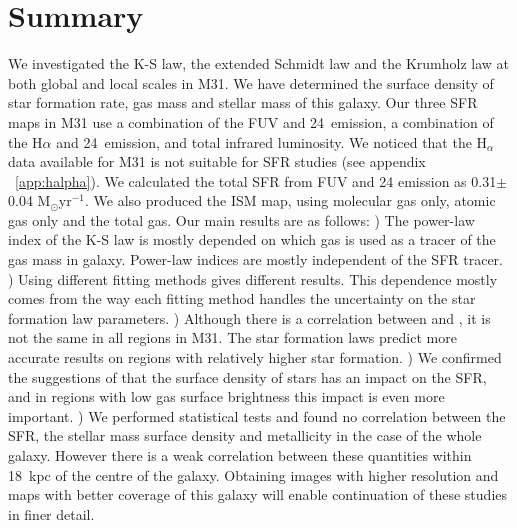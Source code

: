 \section{Summary}
 We investigated the K-S law, the extended Schmidt law and the Krumholz law at both global and local scales in M31. We have determined the surface density of star formation rate, gas mass and stellar mass of this galaxy. Our three SFR maps in M31 use a combination of the FUV and 24~\um emission, a combination of the H$\alpha$ and 24~\um emission, and total infrared luminosity. We noticed that the H$_\alpha$ data available for M31 is not suitable for SFR studies (see appendix ~\ref{app:halpha}). We calculated the total SFR from FUV and 24 \um emission as 0.31$\pm$ 0.04 M$_{\odot}$yr$^{-1}$. We also produced the ISM map, using molecular gas only, atomic gas only and the total gas. Our main results are as follows:
) The power-law index of the K-S law is mostly depended on which gas is used as a tracer of the gas mass in galaxy. Power-law indices are mostly independent of the SFR tracer.
) Using different fitting methods gives different results. This dependence mostly comes from the way each fitting method handles the uncertainty on the star formation law parameters.
) Although there is a correlation between \sigmasfr and \sigmagas, it is not the same in all regions in M31. The star formation laws predict more accurate results on regions with relatively higher star formation. 
) We confirmed the suggestions of \citet{Shi11} that the surface density of stars has an impact on the SFR, and in regions with low gas surface brightness this impact is even more important. 
) We performed statistical tests and found no correlation between the SFR, the stellar mass surface density and metallicity in the case of the whole galaxy. However there is a weak correlation between these quantities within 18~kpc of the centre of the galaxy.
\newline 
Obtaining images with higher resolution and maps with better coverage of this galaxy will enable continuation of these studies in finer detail.


